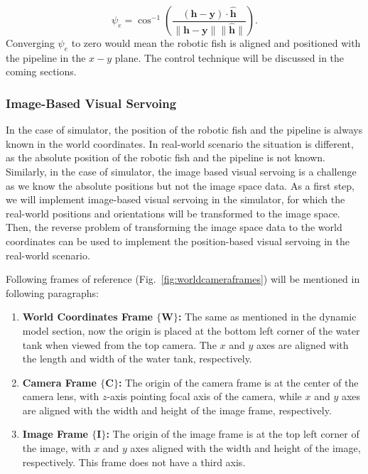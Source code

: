 \documentclass[pdflatex,sn-mathphys-num]{sn-jnl}
\theoremstyle{thmstyleone}%
\begin{document}
\begin{equation}
    \psi_e = \cos^{-1} \left( \frac{\mathbf{(h - y)} \cdot \hat{\mathbf{h}}}{\|\mathbf{h - y}\| \|\hat{\mathbf{h}}\|} \right).
\end{equation}
Converging $\psi_e$ to zero would mean the robotic fish is aligned and positioned with the pipeline in the $x-y$ plane. The control technique will be discussed in the coming sections.
\subsubsection{Image-Based Visual Servoing}
\par In the case of simulator, the position of the robotic fish and the pipeline is always known in the world coordinates. In real-world scenario the situation is different, as the absolute position of the robotic fish and the pipeline is not known. Similarly, in the case of simulator, the image based visual servoing is a challenge as we know the absolute positions but not the image space data. As a first step, we will implement image-based visual servoing in the simulator, for which the real-world positions and orientations will be transformed to the image space. Then, the reverse problem of transforming the image space data to the world coordinates can be used to implement the position-based visual servoing in the real-world scenario.
\par Following frames of reference (Fig.~\ref{fig:worldcameraframes}) will be mentioned in following paragraphs:
\begin{enumerate}
    \item \textbf{World Coordinates Frame $\mathbf{\{W\}}$:} The same as mentioned in the dynamic model section, now the origin is placed at the bottom left corner of the water tank when viewed from the top camera. The $x$ and $y$ axes are aligned with the length and width of the water tank, respectively.
    \item \textbf{Camera Frame $\mathbf{\{C\}}$:} The origin of the camera frame is at the center of the camera lens, with $z$-axis pointing focal axis of the camera, while $x$ and $y$ axes are aligned with the width and height of the image frame, respectively.
    \item \textbf{Image Frame $\mathbf{\{I\}}$:} The origin of the image frame is at the top left corner of the image, with $x$ and $y$ axes aligned with the width and height of the image, respectively. This frame does not have a third axis.
\end{enumerate}
\end{document}
